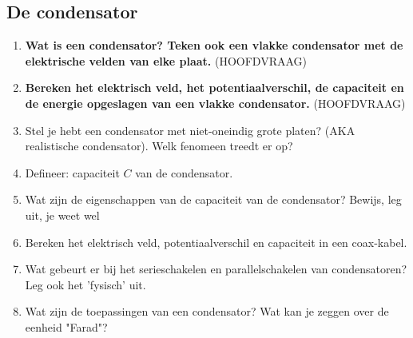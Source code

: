 \documentclass[12pt]{article}
\begin{document}
    \subsection{De condensator}
    \begin{enumerate}
        \item \textbf{Wat is een condensator? Teken ook een vlakke condensator met de elektrische velden van elke plaat.} (HOOFDVRAAG)
        \item \textbf{Bereken het elektrisch veld, het potentiaalverschil, de capaciteit en de energie opgeslagen van een vlakke condensator.} (HOOFDVRAAG)
        \item Stel je hebt een condensator met niet-oneindig grote platen? (AKA realistische condensator). Welk fenomeen treedt er op?
        \item Defineer: capaciteit $C$ van de condensator.
        \item Wat zijn de eigenschappen van de capaciteit van de condensator? Bewijs, leg uit, je weet wel
        \item Bereken het elektrisch veld, potentiaalverschil en capaciteit in een coax-kabel.
        \item Wat gebeurt er bij het serieschakelen en parallelschakelen van condensatoren? Leg ook het 'fysisch' uit.
        \item Wat zijn de toepassingen van een condensator? Wat kan je zeggen over de eenheid "Farad"?
    \end{enumerate}
\end{document}
